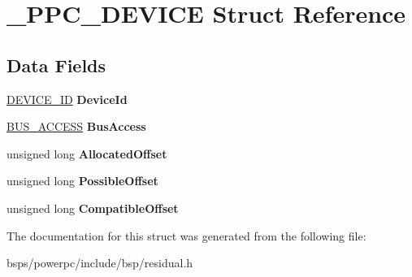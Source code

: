 \hypertarget{struct__PPC__DEVICE}{}\section{\+\_\+\+P\+P\+C\+\_\+\+D\+E\+V\+I\+CE Struct Reference}
\label{struct__PPC__DEVICE}
\subsection*{Data Fields}
\begin{DoxyCompactItemize}
\item 
\mbox{\label{struct__PPC__DEVICE_a272766852faa0b822504b67f3292e8ce}} 
\mbox{\hyperlink{struct__DEVICE__ID}{D\+E\+V\+I\+C\+E\+\_\+\+ID}} {\bfseries Device\+Id}
\item 
\mbox{\label{struct__PPC__DEVICE_ae3ddbed300bdd5a26712eeecc4f1a71a}} 
\mbox{\hyperlink{union__BUS__ACCESS}{B\+U\+S\+\_\+\+A\+C\+C\+E\+SS}} {\bfseries Bus\+Access}
\item 
\mbox{\label{struct__PPC__DEVICE_a561c0d32f7d8983486cfd1d74b2aba07}} 
unsigned long {\bfseries Allocated\+Offset}
\item 
\mbox{\label{struct__PPC__DEVICE_a6885e137cfa25444878dc035de543ffc}} 
unsigned long {\bfseries Possible\+Offset}
\item 
\mbox{\label{struct__PPC__DEVICE_a25a2f99d72aab7f26e8faa1456e4c2bd}} 
unsigned long {\bfseries Compatible\+Offset}
\end{DoxyCompactItemize}


The documentation for this struct was generated from the following file\+:\begin{DoxyCompactItemize}
\item 
bsps/powerpc/include/bsp/residual.\+h\end{DoxyCompactItemize}
